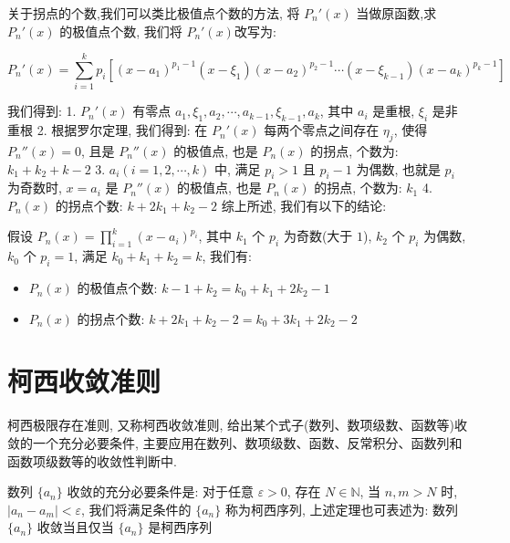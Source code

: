 \begin{anymark}[证明]
	关于拐点的个数,我们可以类比极值点个数的方法, 将 $P_{n}'(x)$ 当做原函数,求 $P_{n}'(x)$ 的极值点个数, 我们将 $P_{n}'(x)$改写为:
	
	$$P_{n}'(x) = \sum\limits_{i=1}^{k}p_{i}\left[(x-a_{1})^{p_{1}-1}(x-\xi_{1})(x-a_{2})^{p_{2}-1}\cdots(x-\xi_{k-1})(x-a_{k})^{p_{k}-1}\right]$$

	我们得到:
	1. $P_{n}'(x)$ 有零点 $a_{1},\xi_{1},a_{2},\cdots,a_{k-1},\xi_{k-1},a_{k}$, 其中 $a_{i}$ 是重根, $\xi_{i}$ 是非重根
	2. 根据罗尔定理, 我们得到: 在 $P_{n}'(x)$ 每两个零点之间存在 $\eta_{j}$, 使得 $P_{n}''(x) = 0$, 且是 $P_{n}''(x)$ 的极值点, 也是 $P_{n}(x)$ 的拐点, 个数为: $k_{1}+k_{2}+k-2$
	3. $a_{i}(i=1,2,\cdots,k)$ 中, 满足 $p_{i} > 1$ 且 $p_{i}-1$ 为偶数, 也就是 $p_{i}$ 为奇数时, $x = a_{i}$ 是 $P_{n}''(x)$ 的极值点, 也是 $P_{n}(x)$ 的拐点, 个数为: $k_{1}$
	4. $P_{n}(x)$ 的拐点个数: $k+2k_{1}+k_{2}-2$
	综上所述, 我们有以下的结论:
	\begin{corollary}[极值点和拐点个数]
		假设 $P_{n}(x)=\prod\limits_{i=1}^{k}(x-a_{i})^{p_{i}}$, 其中 $k_{1}$ 个 $p_{i}$ 为奇数(大于 $1$), $k_{2}$ 个 $p_{i}$ 为偶数, $k_{0}$ 个 $p_{i}=1$, 满足 $k_{0}+k_{1}+k_{2} = k$, 我们有:
		\begin{itemize}
			\item $P_{n}(x)$ 的极值点个数: $k-1+k_{2} = k_{0}+k_{1}+2k_{2}-1$
			\item $P_{n}(x)$ 的拐点个数: $k+2k_{1}+k_{2}-2 = k_{0}+3k_{1}+2k_{2}-2$
		\end{itemize}
	\end{corollary}
\end{anymark}

\section{柯西收敛准则}

\begin{theorem}[柯西收敛准则]\label{the: 柯西收敛准则}
	柯西极限存在准则, 又称柯西收敛准则, 给出某个式子(数列、数项级数、函数等)收敛的一个充分必要条件, 主要应用在数列、数项级数、函数、反常积分、函数列和函数项级数等的收敛性判断中.
\end{theorem}

\begin{proposition}[柯西收敛准则:数列]
	数列 $\{a_{n}\}$ 收敛的充分必要条件是: 对于任意 $\varepsilon > 0$, 存在 $N\in\mathbb{N}$, 当 $n,m>N$ 时, $|a_{n}-a_{m}|<\varepsilon$, 我们将满足条件的 $\{a_{n}\}$ 称为柯西序列, 上述定理也可表述为: 数列 $\{a_{n}\}$ 收敛当且仅当 $\{a_{n}\}$ 是柯西序列
\end{proposition}

